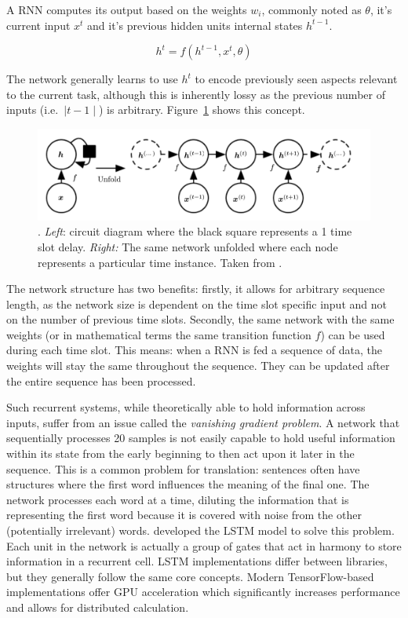 A \ac{RNN} computes its output based on the weights $w_i$, commonly noted as $\theta$, it's current input
$x^t$ and it's previous hidden units internal states $h^{t-1}$.

\begin{equation}
    h^t = f(h^{t-1}, x^t, \theta)
\end{equation}

The network generally learns to use $h^t$ to encode previously seen aspects relevant to the current task, although this
is inherently lossy as the previous number of inputs (i.e.\ $\mid t-1\mid$) is arbitrary. Figure~\ref{fig:rnn_concept}
shows this concept.

\begin{figure}[]
    \centering
    \includegraphics[width=0.8\linewidth]{img/rnn_concept.png}
    \caption[Recurrent Neural Network conceptualized]{. \emph{Left}: circuit diagram where the black square represents a
        1 time slot delay. \emph{Right:} The same network unfolded where each node represents a particular time instance.
    Taken from \citet{Goodfellow-et-al-2016}.}
    \label{fig:rnn_concept}
\end{figure}

The network structure has two benefits: firstly, it allows for arbitrary sequence length, as the network size is
dependent on the time slot specific input and not on the number of previous time slots. Secondly, the same network with
the same weights (or in mathematical terms the same transition function $f$) can be used during each time slot. This
means: when a \ac{RNN} is fed a sequence of data, the weights will stay the same throughout the sequence. They can be
updated after the entire sequence has been processed.

Such recurrent systems, while theoretically able to hold information across inputs, suffer from an issue called the
\emph{vanishing gradient problem}. A network that sequentially processes 20 samples is not easily capable to hold useful
information within its state from the early beginning to then act upon it later in the sequence. This is a common
problem for translation: sentences often have structures where the first word influences the meaning of the final one.
The network processes each word at a time, diluting the information that is representing the first word because it
is covered with noise from the other (potentially irrelevant) words. \citet{Hochreiter:1997:LSM:1246443.1246450}
developed the \ac{LSTM} model to solve this problem. Each unit in the network is actually a group of gates that act in
harmony to store information in a recurrent cell. \ac{LSTM} implementations differ between libraries, but they generally
follow the same core concepts. Modern TensorFlow-based implementations offer \ac{GPU} acceleration which significantly
increases performance and allows for distributed calculation.


